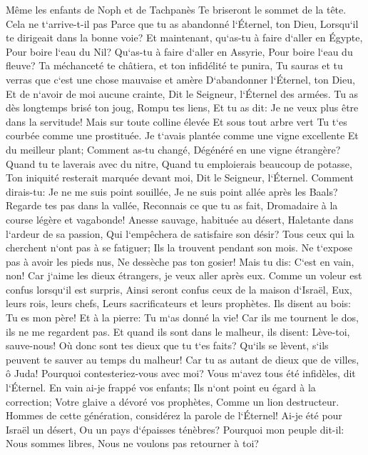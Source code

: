 \verse Même les enfants de Noph et de Tachpanès Te briseront le sommet de la tête. 
\verse Cela ne t`arrive-t-il pas Parce que tu as abandonné l`Éternel, ton Dieu, Lorsqu`il te dirigeait dans la bonne voie? 
\verse Et maintenant, qu`as-tu à faire d`aller en Égypte, Pour boire l`eau du Nil? Qu`as-tu à faire d`aller en Assyrie, Pour boire l`eau du fleuve? 
\verse Ta méchanceté te châtiera, et ton infidélité te punira, Tu sauras et tu verras que c`est une chose mauvaise et amère D`abandonner l`Éternel, ton Dieu, Et de n`avoir de moi aucune crainte, Dit le Seigneur, l`Éternel des armées. 
\verse Tu as dès longtemps brisé ton joug, Rompu tes liens, Et tu as dit: Je ne veux plus être dans la servitude! Mais sur toute colline élevée Et sous tout arbre vert Tu t`es courbée comme une prostituée. 
\verse Je t`avais plantée comme une vigne excellente Et du meilleur plant; Comment as-tu changé, Dégénéré en une vigne étrangère? 
\verse Quand tu te laverais avec du nitre, Quand tu emploierais beaucoup de potasse, Ton iniquité resterait marquée devant moi, Dit le Seigneur, l`Éternel. 
\verse Comment dirais-tu: Je ne me suis point souillée, Je ne suis point allée après les Baals? Regarde tes pas dans la vallée, Reconnais ce que tu as fait, Dromadaire à la course légère et vagabonde! 
\verse Anesse sauvage, habituée au désert, Haletante dans l`ardeur de sa passion, Qui l`empêchera de satisfaire son désir? Tous ceux qui la cherchent n`ont pas à se fatiguer; Ils la trouvent pendant son mois. 
\verse Ne t`expose pas à avoir les pieds nus, Ne dessèche pas ton gosier! Mais tu dis: C`est en vain, non! Car j`aime les dieux étrangers, je veux aller après eux. 
\verse Comme un voleur est confus lorsqu`il est surpris, Ainsi seront confus ceux de la maison d`Israël, Eux, leurs rois, leurs chefs, Leurs sacrificateurs et leurs prophètes. 
\verse Ils disent au bois: Tu es mon père! Et à la pierre: Tu m`as donné la vie! Car ils me tournent le dos, ils ne me regardent pas. Et quand ils sont dans le malheur, ils disent: Lève-toi, sauve-nous! 
\verse Où donc sont tes dieux que tu t`es faits? Qu`ils se lèvent, s`ils peuvent te sauver au temps du malheur! Car tu as autant de dieux que de villes, ô Juda! 
\verse Pourquoi contesteriez-vous avec moi? Vous m`avez tous été infidèles, dit l`Éternel. 
\verse En vain ai-je frappé vos enfants; Ils n`ont point eu égard à la correction; Votre glaive a dévoré vos prophètes, Comme un lion destructeur. 
\verse Hommes de cette génération, considérez la parole de l`Éternel! Ai-je été pour Israël un désert, Ou un pays d`épaisses ténèbres? Pourquoi mon peuple dit-il: Nous sommes libres, Nous ne voulons pas retourner à toi? 
